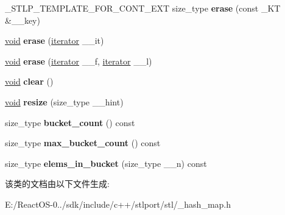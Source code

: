 \begin{DoxyCompactItemize}
\+\_\+\+S\+T\+L\+P\+\_\+\+T\+E\+M\+P\+L\+A\+T\+E\+\_\+\+F\+O\+R\+\_\+\+C\+O\+N\+T\+\_\+\+E\+XT size\+\_\+type {\bfseries erase} (const \+\_\+\+KT \&\+\_\+\+\_\+key)
\item 
\mbox{\label{classhash__multimap_a1ee0c3cc98a4ebcc18330a2ceaf46259}} 
\hyperlink{interfacevoid}{void} {\bfseries erase} (\hyperlink{structiterator}{iterator} \+\_\+\+\_\+it)
\item 
\mbox{\label{classhash__multimap_aa8eeee3e7375a6fd51f11c40aeedd75d}} 
\hyperlink{interfacevoid}{void} {\bfseries erase} (\hyperlink{structiterator}{iterator} \+\_\+\+\_\+f, \hyperlink{structiterator}{iterator} \+\_\+\+\_\+l)
\item 
\mbox{\label{classhash__multimap_a6c0e7c69cc217ec8d2ba805674f72583}} 
\hyperlink{interfacevoid}{void} {\bfseries clear} ()
\item 
\mbox{\label{classhash__multimap_aa81e96e3718f7d94a1bd95a8bcb68a65}} 
\hyperlink{interfacevoid}{void} {\bfseries resize} (size\+\_\+type \+\_\+\+\_\+hint)
\item 
\mbox{\label{classhash__multimap_a0848ee197397e80a05a1489b9f308d89}} 
size\+\_\+type {\bfseries bucket\+\_\+count} () const
\item 
\mbox{\label{classhash__multimap_ab955cc49ead2823c5563d5fbd77d9826}} 
size\+\_\+type {\bfseries max\+\_\+bucket\+\_\+count} () const
\item 
\mbox{\label{classhash__multimap_a238829f4c756031d1871666f24b78a8a}} 
size\+\_\+type {\bfseries elems\+\_\+in\+\_\+bucket} (size\+\_\+type \+\_\+\+\_\+n) const
\end{DoxyCompactItemize}


该类的文档由以下文件生成\+:\begin{DoxyCompactItemize}
\item 
E\+:/\+React\+O\+S-\/0../sdk/include/c++/stlport/stl/\+\_\+hash\+\_\+map.\+h\end{DoxyCompactItemize}
